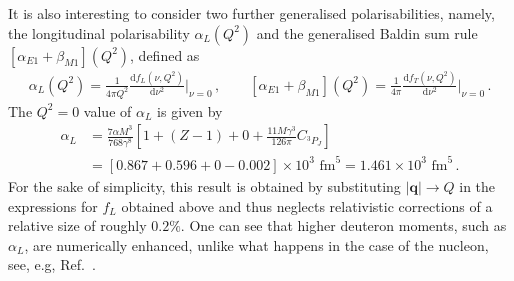\documentclass[prl,
twocolumn,
showpacs,preprintnumbers,amsmath,amssymb,
superscriptaddress,
a4paper,nofootinbib,longbibliography]{revtex4-2}
\def\bv#1{\boldsymbol{#1}}
\begin{document}
It is also interesting to consider two further generalised polarisabilities, namely, the longitudinal polarisability $\alpha_L(Q^2)$ and the generalised Baldin sum rule $[\alpha_{E1}+\beta_{M1}](Q^2)$, defined as
\begin{align}
\alpha_L(Q^2) = \frac{1}{4\pi Q^2}\frac{\mathrm{d}f_L(\nu,Q^2)}{\mathrm{d}\nu^2}\bigg|_{\nu=0} \,, \qquad
[\alpha_{E1}+\beta_{M1}](Q^2)=\frac{1}{4\pi}\frac{\mathrm{d}f_T(\nu,Q^2)}{\mathrm{d}\nu^2}\bigg|_{\nu=0}\,.
\end{align}
The $Q^2=0$ value of $\alpha_L$ is given by
\begin{align}
    \alpha_L & = \frac{7\alpha M^3}{768\gamma^8}\left[1+(Z-1)+0+\frac{11M\gamma^3}{126\pi}C_{{}^{3\!}P_J}\right]\nonumber\\
    & = \left[0.867+0.596+0-0.002\right]\times 10^3\text{ fm}^5=1.461\times 10^3\text{ fm}^5\,.
\end{align}
For the sake of simplicity, this result is obtained by substituting $|\bv{q}|\to Q$ in the expressions for $f_L$ obtained above and thus neglects relativistic corrections of a relative size of roughly $0.2\%$. One can see that higher deuteron moments, such as $\alpha_L$, are numerically enhanced, unlike what happens in the case of the nucleon, see, e.g, Ref.~\cite{Alarcon:2020wjg}.
\end{document}
